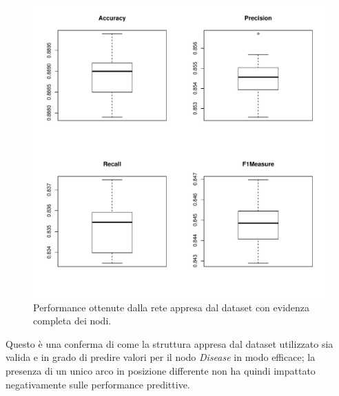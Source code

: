 \begin{figure}
	\centering
	\includegraphics[width=0.7\linewidth]{images/induced_performance}
	\caption{Performance ottenute dalla rete appresa dal dataset con evidenza completa dei nodi.}
	\label{fig:inducedperformance}
\end{figure}
Questo è una conferma di come la struttura appresa dal dataset utilizzato sia valida e in grado di predire valori per il nodo \textit{Disease} in modo efficace; la presenza di un unico arco in posizione differente non ha quindi impattato negativamente sulle performance predittive.

